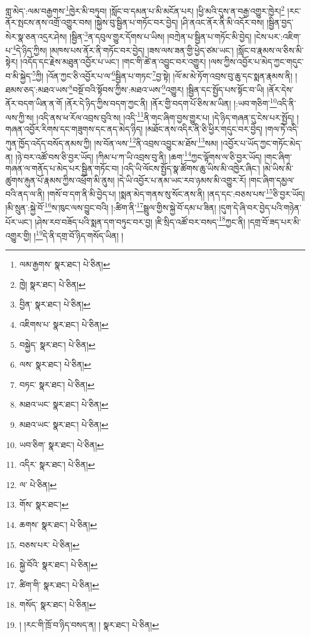 གླ་མེད་:ལམ་བརྒྱགས་\footnote{ལམ་རྒྱགས་  སྣར་ཐང་།  པེ་ཅིན། }ཁྱེར་མི་བཏུབ། །སློང་བ་དམན་པ་མི་མངོན་པར། །ཕྱི་མའི་དུས་ན་བརྒྱ་འགྱུར་ཁྱེར།\footnote{ཁྱེ།  སྣར་ཐང་།  པེ་ཅིན། } །རང་ནོར་སྤངས་ནས་འགྲོ་འགྱུར་བས། །སྐྱེས་བུ་སྦྱིན་པ་གཏོང་བར་བྱེད། །ཤི་ནའང་ནོར་ནི་མི་འདོར་བས། །སྦྱིན་བྱད་སེར་སྣ་ཅན་འདྲར་ཤེས། །སྦྱིན་\footnote{བྱིན་  སྣར་ཐང་།  པེ་ཅིན། }ན་དབུལ་གྱུར་དོགས་པ་ཡིས། །བཀྲེན་པ་སྦྱིན་པ་གཏོང་མི་བྱེད། །ངེས་པར་:འཇིག་པ་\footnote{འཇིགས་པ་  སྣར་ཐང་།  པེ་ཅིན། }དེ་ཉིད་ཀྱིས། །མཁས་པས་ནོར་ནི་གཏོང་བར་བྱེད། །ཟས་ལས་ཟན་གྱི་ཕྱེད་ཙམ་ཡང་། །སློང་བ་རྣམས་ལ་ཅིས་མི་སྟེར། །འདོད་དང་རྗེས་མཐུན་འབྱོར་པ་ཡང་། །གང་གི་ཚེ་ན་འབྱུང་བར་འགྱུར། །ལས་ཀྱིས་འབྱོར་པ་མེད་ཀྱང་གདུང་བ་མི་སྐྱེད་\footnote{བསྐྱེད་  སྣར་ཐང་།  པེ་ཅིན། }ཀྱི། །འོན་ཀྱང་ཅི་འབྱོར་པ་ལ་\footnote{ལས་  སྣར་ཐང་།  པེ་ཅིན། }སྦྱིན་པ་གཏང་\footnote{བཏང་  སྣར་ཐང་།  པེ་ཅིན། }བྱ་སྟེ། །ལོ་མ་མེ་ཏོག་འབྲས་བུ་ཆུ་དང་སྨན་རྣམས་ནི། །ཐམས་ཅད་:མཐའ་ཡས་\footnote{མཐའ་ཡང་  སྣར་ཐང་།  པེ་ཅིན། }བསྔོ་བའི་སྟོབས་ཀྱིས་:མཐའ་ཡས་\footnote{མཐའ་ཡང་  སྣར་ཐང་།  པེ་ཅིན། }འགྱུར། །སྦྱིན་དང་སྤྱོད་པས་སྟོང་བ་ཡི། །ནོར་དེས་ནོར་བདག་ཡིན་ན་གོ །ནོར་དེ་ཉིད་ཀྱིས་བདག་ཀྱང་ནི། །ནོར་གྱི་བདག་པོ་ཅིས་མ་ཡིན། །:ཡབ་གཅིག་\footnote{ཡབ་ཅིག་  སྣར་ཐང་།  པེ་ཅིན། }འདི་ནི་ལས་ཀྱི་ས། །འདི་ནས་ཕ་རོལ་འབྲས་བུའི་ས། །འདི་\footnote{འདིར་  སྣར་ཐང་།  པེ་ཅིན། }ནི་གང་ཞིག་བྱས་གྱུར་པ། །དེ་ཉིད་གཞན་དུ་ངེས་པར་སྤྱོད། །གཞན་འབྱོར་རིགས་དང་གཟུགས་དང་ནད་མེད་ཉིད། །མཐོང་ནས་འདིར་ནི་ཅི་ཕྱིར་གདུང་བར་བྱེད། །གལ་ཏེ་འདི་ཀུན་ཁྱོད་འདོད་བསོད་ནམས་ཀྱི། །ས་བོན་ལས་\footnote{ལ་  པེ་ཅིན། }ནི་འབྲས་འབྱུང་མ་ཐོས་\footnote{གོས་  སྣར་ཐང་། }སམ། །འབྱོར་པ་ཡོད་ཀྱང་གཏོང་མེད་ན། །ཉེ་བར་འཚོ་བས་ཅི་བྱར་ཡོད། །ཀིམ་པ་ཀ་ཡི་འབྲས་བུ་ནི། །ཆག་\footnote{ཆགས་  སྣར་ཐང་།  པེ་ཅིན། }ཀྱང་ལྟོགས་ལ་ཅི་བྱར་ཡོད། །གང་ཞིག་གཞན་ལ་གནོད་པ་མེད་པར་སྦྱིན་གཏོང་བ། །འདི་ཡི་ལོངས་སྤྱོད་སྣ་ཚོགས་ཆུ་ཡིས་མི་འཁྱེར་ཞིང་། །མེ་ཡིས་མི་ཚུགས་རྐུན་པོ་རྣམས་ཀྱིས་འཕྲོག་མི་ནུས། །དེ་ཡི་འབྱོར་པ་ནམ་ཡང་རབ་ཉམས་མི་འགྱུར་རོ། །གང་ཞིག་དམྱལ་བའི་ནད་ལ་ནི། །གསོ་བ་དག་ནི་མི་བྱེད་པ། །སྨན་མེད་གནས་སུ་སོང་ནས་ནི། །ནད་དང་:བཅས་པས་\footnote{བཅས་པར་  པེ་ཅིན། }ཅི་བྱར་ཡོད། །མི་སྲུན་:སྐྱེ་བོ་\footnote{སྐྱེ་བོའི་  སྣར་ཐང་།  པེ་ཅིན། }ས་ཁུང་ལས་བྱུང་བའི། །:ཚིག་ནི་\footnote{ཚིག་གི་  སྣར་ཐང་།  པེ་ཅིན། }སྦྲུལ་གྱིས་སྐྱེ་བོ་དམ་པ་ཟིན། །དུག་དེ་ཞི་བར་བྱེད་པའི་གཉེན་པོར་ཡང་། །ཤེས་རབ་བཟོད་པའི་སྨན་དག་བཏུང་བར་བྱ། །ཇི་སྲིད་འཚོ་བར་བསད་\footnote{གསོད་  སྣར་ཐང་།  པེ་ཅིན། }ཀྱང་ནི། །དགྲ་བོ་ཟད་པར་མི་འགྱུར་གྱི། །\footnote{། །རང་གི་ཁྲོ་བ་ཉིད་བསད་ན། །  སྣར་ཐང་།  པེ་ཅིན། }དེ་ནི་དགྲ་བོ་ཉིད་གསོད་ཡིན། །
